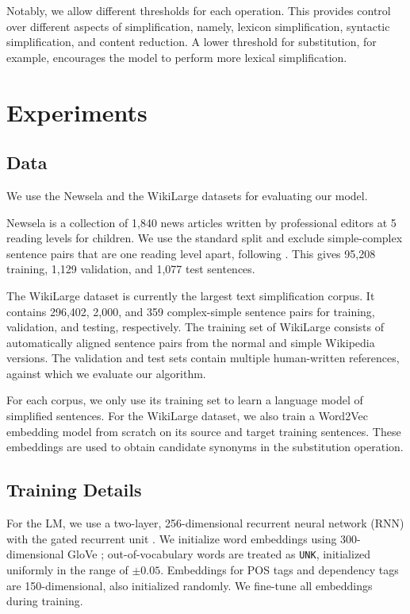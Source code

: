 \documentclass[11pt,a4paper]{article}
\begin{document}
Notably, we allow different thresholds for each operation.  This provides control over different aspects of simplification, namely, lexicon simplification, syntactic simplification, and content reduction. A lower threshold for substitution, for example, encourages the model to perform more lexical simplification. 

\section{Experiments}

\subsection{Data}
\label{ssec:layout}

We use the Newsela \cite{xu2015problems} and the WikiLarge datasets \cite{zhang2017sentence} for evaluating our model. 

Newsela is a collection of 1,840 news articles written by professional editors at 5 reading levels for children.  We use the standard split and exclude simple-complex sentence pairs that are one reading level apart, following . 
This gives 95,208 training, 1,129 validation, and 1,077 test sentences. 

The WikiLarge dataset is currently the largest text simplification corpus. It contains 296,402, 2,000, and 359 complex-simple sentence pairs for training, validation, and testing, respectively. The training set of WikiLarge consists of automatically aligned sentence pairs from the normal and simple Wikipedia versions. The validation and test sets contain multiple human-written references, against which we evaluate our algorithm. 

For each corpus, we only use its training set to learn a language model of simplified sentences. {For the WikiLarge dataset,} we also train a Word2Vec embedding model from scratch on its source and target training sentences. These embeddings are used to obtain candidate synonyms in the substitution operation. 



\subsection{Training Details}

For the LM, we use a two-layer, 256-dimensional recurrent neural network (RNN) with the gated recurrent unit \cite[GRU,][]{chung2014empirical}.
We initialize word embeddings using 300-dimensional GloVe \cite{pennington2014glove}; out-of-vocabulary words are treated as \texttt{UNK}, initialized uniformly in the range of $\pm 0.05$. Embeddings for POS tags and dependency tags are 150-dimensional, also initialized randomly. We fine-tune all embeddings during training.   
\end{document}
